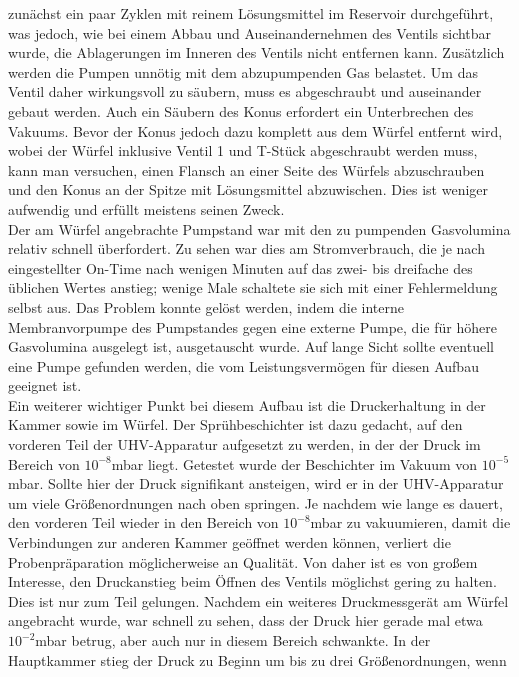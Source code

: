 zunächst ein paar Zyklen mit reinem Lösungsmittel im Reservoir durchgeführt, was jedoch, wie bei
einem Abbau und Auseinandernehmen des Ventils sichtbar wurde, die Ablagerungen im Inneren des
Ventils nicht entfernen kann. Zusätzlich werden die Pumpen unnötig mit dem abzupumpenden Gas
belastet. Um das Ventil daher wirkungsvoll zu säubern, muss es abgeschraubt und auseinander gebaut
werden. Auch ein Säubern des Konus erfordert ein Unterbrechen des Vakuums. Bevor der Konus jedoch
dazu komplett aus dem Würfel entfernt wird, wobei der Würfel inklusive Ventil 1 und T-Stück
abgeschraubt werden muss, kann man versuchen, einen Flansch an einer Seite des Würfels abzuschrauben
und den Konus an der Spitze mit Lösungsmittel abzuwischen. Dies ist weniger aufwendig und
erfüllt meistens seinen Zweck.\\
Der am Würfel angebrachte Pumpstand war mit den zu pumpenden Gasvolumina relativ schnell
überfordert. Zu sehen war dies am Stromverbrauch, die je nach eingestellter On-Time nach
wenigen Minuten auf das zwei- bis dreifache des üblichen Wertes anstieg; wenige Male schaltete sie
sich mit einer Fehlermeldung selbst aus. Das Problem konnte gelöst werden, indem die interne
Membranvorpumpe des Pumpstandes gegen eine externe Pumpe, die für höhere Gasvolumina ausgelegt ist,
ausgetauscht wurde.
Auf lange Sicht sollte eventuell eine Pumpe gefunden werden, die vom Leistungsvermögen für diesen
Aufbau geeignet ist.\\
Ein weiterer wichtiger Punkt bei diesem Aufbau ist die Druckerhaltung in der Kammer sowie im Würfel.
Der Sprühbeschichter ist dazu gedacht, auf den vorderen Teil der UHV-Apparatur aufgesetzt zu werden,
in der der Druck im Bereich von $10^{-8}$mbar liegt. Getestet wurde der Beschichter im Vakuum von
$10^{-5}$mbar. Sollte hier der Druck signifikant ansteigen, wird er in der UHV-Apparatur um viele
Größenordnungen nach oben springen. Je nachdem wie lange es dauert, den vorderen Teil wieder in den
Bereich von $10^{-8}$mbar zu vakuumieren, damit die Verbindungen zur anderen Kammer geöffnet werden
können, verliert die Probenpräparation möglicherweise an Qualität. Von daher ist es von großem
Interesse, den Druckanstieg beim Öffnen des Ventils möglichst gering zu halten.\\
Dies ist nur zum Teil gelungen. Nachdem ein weiteres Druckmessgerät am Würfel angebracht wurde, war
schnell zu sehen, dass der Druck hier gerade mal etwa $10^{-2}$mbar betrug, aber auch nur in diesem
Bereich schwankte. In der Hauptkammer stieg der Druck zu Beginn um bis zu drei Größenordnungen, wenn
